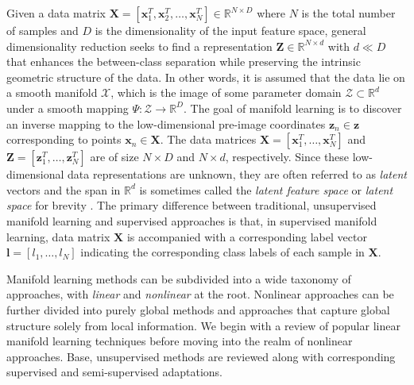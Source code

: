 Given a data matrix $\bm{X} = [\bm{x}^{T}_{1}, \bm{x}^{T}_{2}, \dots, \bm{x}^{T}_{N}] \in \mathbb{R}^{N \times D}$ where $N$ is the total number of samples and $D$ is the dimensionality of the input feature space, general dimensionality reduction seeks to find a representation $\bm{Z} \in \mathbb{R}^{N \times d}$ with $d \ll D$ that enhances the between-class separation while preserving the intrinsic geometric structure of the data\citep{Vural2018StudySupervisedManifoldLearning}.  In other words, it is assumed that the data lie on a smooth manifold $\mathcal{X}$, which is the image of some parameter domain $\mathcal{Z} \subset \mathbb{R}^{d}$ under a smooth mapping $\Psi : \mathcal{Z} \rightarrow \mathbb{R}^{D}$.  The goal of manifold learning is to discover an inverse mapping to the low-dimensional pre-image coordinates $\bm{z}_n \in \bm{z}$ corresponding to points $\bm{x}_n \in \bm{X}$.  The data matrices $\bm{X} = [\bm{x}^{T}_{1}, \dots, \bm{x}^{T}_{N}]$ and $\bm{Z} = [\bm{z}^{T}_{1}, \dots, \bm{z}^{T}_{N}]$ are of size $N \times D$ and $N \times d$, respectively.  Since these low-dimensional data representations are unknown, they are often referred to as \textit{latent} vectors and the span in $\mathbb{R}^d$ is sometimes called the \textit{latent feature space} or \textit{latent space} for brevity \citep{Murphy2012}. The primary difference between traditional, unsupervised manifold learning and supervised approaches is that, in supervised manifold learning, data matrix $\bm{X} $ is accompanied with a corresponding label vector $\bm{l} = [l_1, \dots, l_N]$ indicating the corresponding class labels of each sample in $\bm{X}$. \newline

Manifold learning methods can be subdivided into a wide taxonomy of approaches, with \textit{linear} and \textit{nonlinear} at the root. Nonlinear approaches can be further divided into purely global methods and approaches that capture global structure solely from local information.  We begin with a review of popular linear manifold learning techniques before moving into the realm of nonlinear approaches. Base, unsupervised methods are reviewed along with corresponding supervised and semi-supervised adaptations. 

